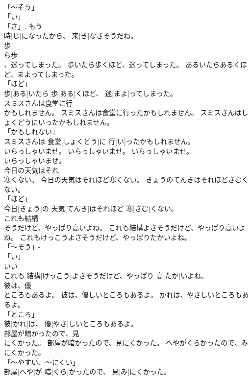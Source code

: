 \documentclass[8pt]{extreport}
\begin{document}
\begin{CJK}{UTF8}{min}
\\	「～そう」 
\\	「い」 
\\	「さ」.	もう 
\\	時[じ]になったから、 来[き]なさそうだね。		
\\	歩
\\	ら歩
\\	、迷ってしまった。	歩いたら歩くほど、迷ってしまった。	あるいたらあるくほど、まよってしまった。	
\\	「ほど」 
\\	歩[ある]いたら 歩[ある]くほど、 迷[まよ]ってしまった。		
\\	スミスさんは食堂に行
\\	かもしれません。	スミスさんは食堂に行ったかもしれません。	スミスさんはしょくどうにいったかもしれません。	
\\	「かもしれない」 
\\	スミスさんは 食堂[しょくどう]に 行[い]ったかもしれません。		
\\	いらっしゃいませ。	いらっしゃいませ。	いらっしゃいませ。	
\\	いらっしゃいませ。		
\\	今日の天気はそれ
\\	寒くない。	今日の天気はそれほど寒くない。	きょうのてんきはそれほどさむくない。	
\\	「ほど」 
\\	今日[きょう]の 天気[てんき]はそれほど 寒[さむ]くない。		
\\	これも結構
\\	そうだけど、やっぱり高いよね。	これも結構よさそうだけど、やっぱり高いよね。	これもけっこうよさそうだけど、やっぱりたかいよね。	
\\	「～そう」- 
\\	「い」 
\\	いい 
\\	これも 結構[けっこう]よさそうだけど、やっぱり 高[たか]いよね。		
\\	彼は、優
\\	ところもあるよ。	彼は、優しいところもあるよ。	かれは、やさしいところもあるよ。	
\\	「ところ」 
\\	彼[かれ]は、 優[やさ]しいところもあるよ。		
\\	部屋が暗かったので、見
\\	にくかった。	部屋が暗かったので、見にくかった。	へやがくらかったので、みにくかった。	
\\	「～やすい、～にくい」 
\\	部屋[へや]が 暗[くら]かったので、 見[み]にくかった。		

\end{CJK}
\end{document}
